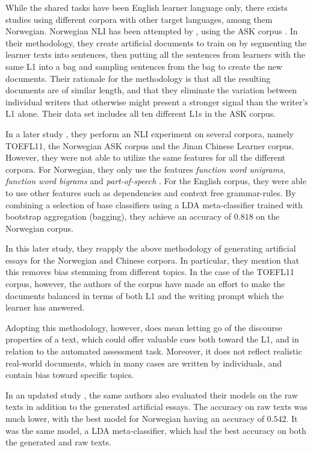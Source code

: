 While the shared tasks have been English learner language only, there exists
studies using different corpora with other target languages, among them
Norwegian. Norwegian \ac{NLI} has been attempted by \textcite{malmasi15},
using the ASK corpus \autocite{tenfjord06}. In their methodology, they create
artificial documents to train on by segmenting the learner texts into
sentences, then putting all the sentences from learners with the same L1 into
a bag and sampling sentences from the bag to create the new documents. Their
rationale for the methodology is that all the resulting documents are of
similar length, and that they eliminate the variation between individual
writers that otherwise might present a stronger signal than the writer's L1
alone. Their data set includes all ten different \acp{L1} in the ASK corpus.

In a later study \autocite{malmasi17}, they perform an \ac{NLI} experiment on
several corpora, namely TOEFL11, the Norwegian ASK corpus and the Jinan
Chinese Learner corpus. However, they were not able to utilize the same
features for all the different corpora. For Norwegian, they only use the
features \emph{function word unigrams}, \emph{function word bigrams} and
\emph{part-of-speech \ngrams}. For the English corpus, they were able to use
other features such as dependencies and context free grammar-rules. By
combining a selection of base classifiers using a \ac{LDA} meta-classifier
trained with bootstrap aggregation (bagging), they achieve an accuracy of
$0.818$ on the Norwegian corpus.

In this later study, they reapply the above methodology of generating
artificial essays for the Norwegian and Chinese corpora. In particular, they
mention that this removes bias stemming from different topics. In the case of
the TOEFL11 corpus, however, the authors of the corpus have made an effort to
make the documents balanced in terms of both L1 and the writing prompt which
the learner has answered.

Adopting this methodology, however, does mean letting go of the discourse
properties of a text, which could offer valuable cues both toward the L1, and
in relation to the automated assessment task. Moreover, it does not reflect
realistic real-world documents, which in many cases are written by
individuals, and contain bias toward specific topics.

In an updated study \autocite{malmasi2018native}, the same authors also
evaluated their models on the raw texts in addition to the generated
artificial essays. The accuracy on raw texts was much lower, with the best
model for Norwegian having an accuracy of $0.542$. It was the same model, a
\ac{LDA} meta-classifier, which had the best accuracy on both the generated
and raw texts.

